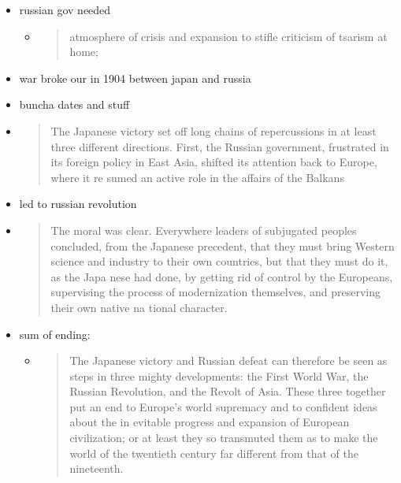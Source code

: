 \documentclass[letterpaper]{article}
\begin{document}
\begin{itemize}
\item russian gov needed

\begin{itemize}
\item \begin{quote}
atmosphere of crisis and expansion to stifle criticism of tsarism
at home;
\end{quote}
\end{itemize}

\item war broke our in 1904 between japan and russia

\item buncha dates and stuff

\item \begin{quote}
The Japanese victory set off long chains of repercussions in at
least three different directions. First, the Russian government,
frustrated in its foreign policy in East Asia, shifted its attention
back to Europe, where it re sumed an active role in the affairs of
the Balkans
\end{quote}

\item led to russian revolution

\item \begin{quote}
The moral was clear. Everywhere leaders of subjugated peoples
concluded, from the Japanese precedent, that they must bring Western
science and industry to their own countries, but that they must do
it, as the Japa nese had done, by getting rid of control by the
Europeans, supervising the process of modernization themselves, and
preserving their own native na tional character.
\end{quote}

\item sum of ending:

\begin{itemize}
\item \begin{quote}
The Japanese victory and Russian defeat can therefore be seen as
steps in three mighty developments: the First World War, the
Russian Revolution, and the Revolt of Asia. These three together
put an end to Europe's world supremacy and to confident ideas
about the in evitable progress and expansion of European
civilization; or at least they so transmuted them as to make the
world of the twentieth century far different from that of the
nineteenth.
\end{quote}
\end{itemize}
\end{itemize}
\end{document}

